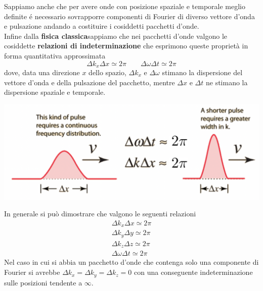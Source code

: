 Sappiamo anche che per avere onde con posizione spaziale e temporale
meglio definite é necessario sovrapporre componenti di Fourier di
diverso vettore d'onda e pulsazione andando a costituire i cosiddetti
pacchetti d'onde.\\
Infine dalla \textbf{fisica classica}sappiamo che nei pacchetti d'onde valgono
le cosiddette \textbf{relazioni di indeterminazione} che esprimono
queste proprietà in forma quantitativa approssimata
\[
	\Delta k_{x} \Delta x \simeq2 \pi \qquad \Delta \omega \Delta t \simeq2 \pi
\] dove, data una direzione $x$ dello spazio, \(\Delta k_{x}\) e
\(\Delta \omega\) stimano la dispersione del vettore d'onda e della
pulsazione del pacchetto, mentre \(\Delta x\) e \(\Delta t\) ne stimano
la dispersione spaziale e temporale.
\begin{marginfigure}
	\includegraphics{figs/rel-indet}
	\label{fig:rel-indet}
\end{marginfigure}

In generale si può dimostrare che valgono le seguenti relazioni
\begin{gather*}
	\Delta k_{x} \Delta x \simeq2 \pi\\
	\Delta k_{y} \Delta y \simeq2 \pi\\
	\Delta k_{z} \Delta z \simeq2 \pi\\
	\Delta \omega \Delta t \simeq2 \pi
\end{gather*} Nel caso in cui si abbia un pacchetto d'onde che contenga solo una
componente di Fourier si avrebbe
\(\Delta k_{x} = \Delta k_{y} = \Delta k_{z} = 0\) con una conseguente
indeterminazione sulle posizioni tendente a \(\infty\).

